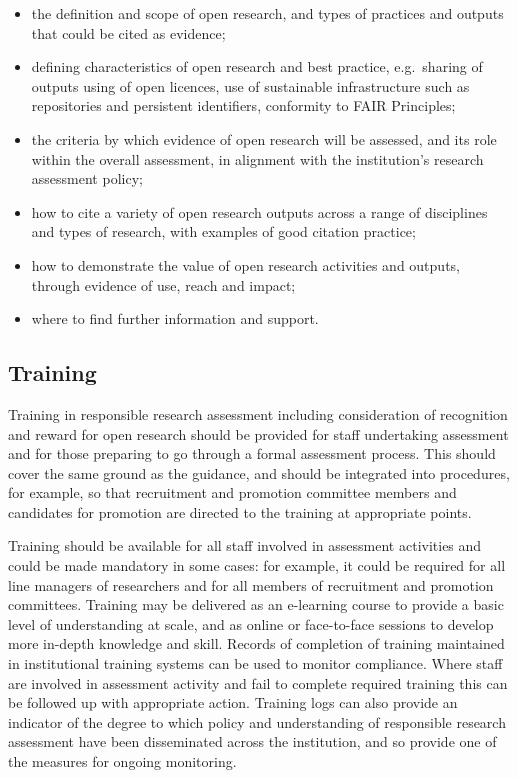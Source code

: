\documentclass[
  letterpaper,
  DIV=11,
  numbers=noendperiod,
  oneside]{scrreprt}
\begin{document}
\begin{itemize}
\item
  the definition and scope of open research, and types of practices and
  outputs that could be cited as evidence;
\item
  defining characteristics of open research and best practice,
  e.g.~sharing of outputs using of open licences, use of sustainable
  infrastructure such as repositories and persistent identifiers,
  conformity to FAIR Principles;
\item
  the criteria by which evidence of open research will be assessed, and
  its role within the overall assessment, in alignment with the
  institution's research assessment policy;
\item
  how to cite a variety of open research outputs across a range of
  disciplines and types of research, with examples of good citation
  practice;
\item
  how to demonstrate the value of open research activities and outputs,
  through evidence of use, reach and impact;
\item
  where to find further information and support.
\end{itemize}

\subsection{Training}\label{training}

Training in responsible research assessment including consideration of
recognition and reward for open research should be provided for staff
undertaking assessment and for those preparing to go through a formal
assessment process. This should cover the same ground as the guidance,
and should be integrated into procedures, for example, so that
recruitment and promotion committee members and candidates for promotion
are directed to the training at appropriate points.

Training should be available for all staff involved in assessment
activities and could be made mandatory in some cases: for example, it
could be required for all line managers of researchers and for all
members of recruitment and promotion committees. Training may be
delivered as an e-learning course to provide a basic level of
understanding at scale, and as online or face-to-face sessions to
develop more in-depth knowledge and skill. Records of completion of
training maintained in institutional training systems can be used to
monitor compliance. Where staff are involved in assessment activity and
fail to complete required training this can be followed up with
appropriate action. Training logs can also provide an indicator of the
degree to which policy and understanding of responsible research
assessment have been disseminated across the institution, and so provide
one of the measures for ongoing monitoring.
\end{document}
